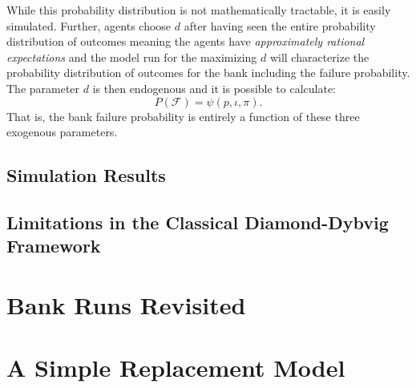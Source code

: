 \documentclass[12pt]{article}
\begin{document}
\begin{doublespace}
While this probability distribution is not mathematically tractable, it is easily simulated. Further, agents choose $d$ after having seen the entire probability distribution of outcomes meaning the agents have \emph{approximately rational expectations} and the model run for the maximizing $d$ will characterize the probability distribution of outcomes for the bank including the failure probability. The parameter $d$ is then endogenous and it is possible to calculate:
$$P\left(\mathcal{F}\right)=\psi\left(p,\iota,\pi\right).$$ 
That is, the bank failure probability is entirely a function of these three exogenous parameters. 
\subsection{Simulation Results}


\subsection{Limitations in the Classical Diamond-Dybvig Framework}


\section{Bank Runs Revisited}



\section{A Simple Replacement Model}

\end{doublespace}
\end{document}
